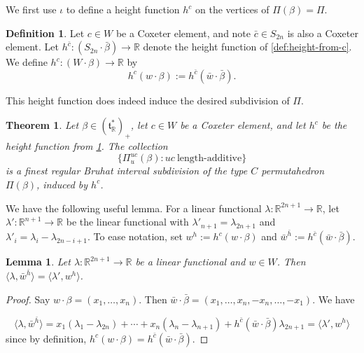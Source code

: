 \documentclass[11pt]{amsart}
\newtheorem{theorem}[Thm]{Theorem}
\newtheorem{lemma}[Thm]{Lemma}
\theoremstyle{definition}
\newtheorem{definition}[Thm]{Definition}
\newcommand{\RR}{\mathbb{R}}
\def\hgt{h}
\def\hc{\hgt^c}
\def\pt{\beta}
\def\hd{\hgt^{\bar{c}}}
\def\BB{{(\lie{t}_\RR^*)_+}}
\newcommand\lie[1]{{\mathfrak #1}}
\begin{document}
We first use $\iota$ to define a height function $\hc$ on the vertices of $\Pi(\pt)= \Pi$.

 \begin{definition}\label{def:type-C-height}
 	Let $c \in W$ be a Coxeter element, and note $\bar{c} \in S_{2n}$ is also a Coxeter element. Let $\hd: (S_{2n} \cdot \bar{\pt}) \to \RR$ denote the height function of \cref{def:height-from-c}. We define $\hc:(W \cdot \pt) \to \RR $ by 
 	\[\hc(w \cdot \pt) := \hd(\bar{w} \cdot \bar{\pt}).\]
 \end{definition}
 
 This height function does indeed induce the desired subdivision of $\Pi$.
 
 \begin{theorem}\label{thm:regular-type-C}
   Let $\pt \in \BB$, let $c \in W$ be a Coxeter element, and let
   $\hc$ be the height function from \cref{def:type-C-height}. The collection
   \[ \{\Pi_u^{uc}(\pt): uc~\text{length-additive}\} \]
   is a finest regular Bruhat interval subdivision of the type $C$
   permutahedron $\Pi(\pt)$, induced by $\hc$.
 \end{theorem}
 
 
 We have the following useful lemma. For a linear functional $\lambda: \RR^{2n+1} \to \RR$, let $\lambda': \RR^{n+1} \to \RR$ be the linear functional with $\lambda'_{n+1}=\lambda_{2n+1}$ and $\lambda'_i= \lambda_i-\lambda_{2n-i+1}$. To ease notation, set $w^h:=\hc(w \cdot \pt)$ and $\bar{w}^{\bar{\hgt}}:=\hd(\bar{w} \cdot \bar{\pt})$.
 
 \begin{lemma} \label{lem:folded-linear-functional}
 	Let $\lambda: \RR^{2n+1} \to \RR$ be a linear functional and $w \in W$. Then $\langle \lambda, \bar{w}^{\bar{\hgt}} \rangle = \langle \lambda', w^h\rangle$.
 \end{lemma}
 \begin{proof} Say $w \cdot \pt=(x_1, \dots, x_n)$. Then $\bar{w} \cdot \bar{\pt} = (x_1, \dots, x_n, -x_n, \dots, -x_1)$. We have 
 	
 	\[\langle \lambda, \bar{w}^{\bar{\hgt}} \rangle = x_1 (\lambda_1 - \lambda_{2n}) + \cdots + x_n (\lambda_n - \lambda_{n+1}) + \hd(\bar{w} \cdot \bar{\pt}) \lambda_{2n+1}= \langle \lambda', w^h \rangle\]
 	since by definition, $\hc(w \cdot \pt) = \hd(\bar{w} \cdot \bar{\pt}).$
 \end{proof}
 
\end{document}
